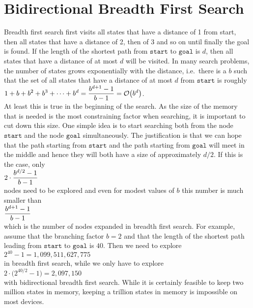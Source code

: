 \section{Bidirectional Breadth First Search}
Breadth first search first visits all states that have a distance of 1 from start, then all
states that have a distance of 2, then of 3 and so on until finally the goal is found.  If the length of the shortest path
from $\mathtt{start}$ to $\mathtt{goal}$ is $d$, then all states that have a distance of at most $d$ will be
visited.  In many search problems, the number of states grows exponentially with the distance, i.e.~there is
a  $b$ such that the set of all states that have a distance of at most $d$
from $\mathtt{start}$ is roughly
\\[0.2cm]
\hspace*{1.3cm}
 $\displaystyle 1 + b + b^2 + b^3 + \cdots + b^d = \frac{b^{d+1} - 1}{b - 1} = \mathcal{O}\bigl(b^d\bigr)$.
\\[0.2cm]
At least this is true in the beginning of the search.  As the size of
the memory that is needed is the most constraining factor when searching, it is important to cut down this
size.  One simple idea is to start searching both from the node $\mathtt{start}$ and the node $\mathtt{goal}$
simultaneously.  The justification is that we can hope that the path starting from $\mathtt{start}$ and the
path starting from $\mathtt{goal}$ will meet in the middle and hence they will both have a size of approximately
$d/2$.  If this is the case, only
\\[0.2cm]
\hspace*{1.3cm}
$\displaystyle 2 \cdot \frac{b^{d/2} - 1}{b - 1}$
\\[0.2cm]
nodes need to be explored and even for modest values of $b$ this number is much smaller than
\\[0.2cm]
\hspace*{1.3cm}
$\displaystyle\frac{b^{d+1} - 1}{b - 1}$
\\[0.2cm]
which is the number of nodes expanded in breadth first search.  For example, assume that the branching factor
$b = 2$ and that the length of the shortest path leading from $\mathtt{start}$ to $\mathtt{goal}$
is $40$.  Then we need to explore
\\[0.2cm]
\hspace*{1.3cm}
$2^{40} - 1 = 1,099,511,627,775$
\\[0.2cm]
in breadth first search, while we only have to explore
\\[0.2cm]
\hspace*{1.3cm}
$2 \cdot \bigl(2^{40/2} - 1\bigr) = 2,097,150$
\\[0.2cm]
with bidirectional breadth first search.  While it is certainly feasible to keep two million states in memory,
keeping a trillion states in memory is impossible on most devices.


